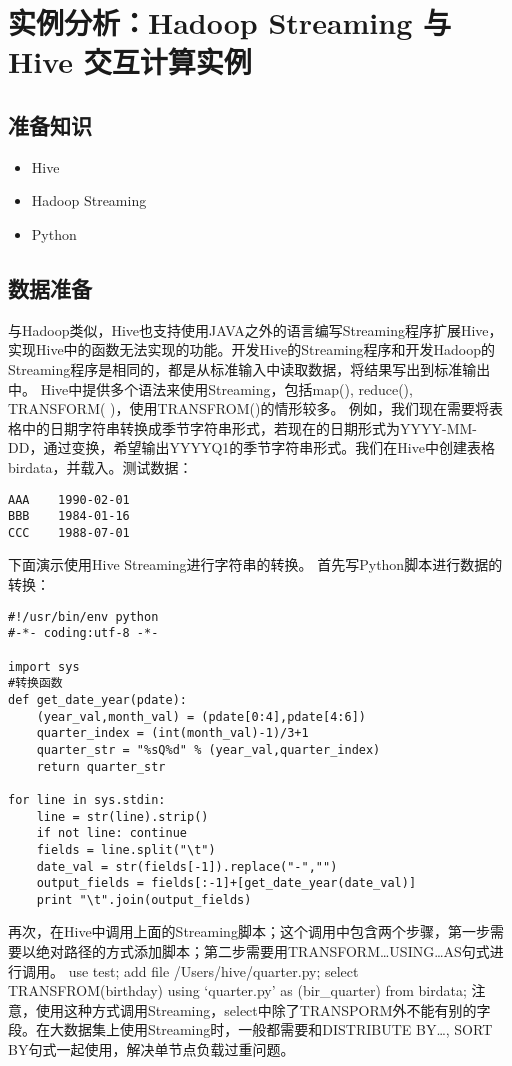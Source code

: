 \section{实例分析：Hadoop Streaming 与 Hive
交互计算实例}\label{ux5b9eux4f8bux5206ux6790hadoop-streaming-ux4e0e-hive-ux4ea4ux4e92ux8ba1ux7b97ux5b9eux4f8b}

\subsection{准备知识}\label{ux51c6ux5907ux77e5ux8bc6}

\begin{itemize}
\itemsep1pt\parskip0pt
\item
  Hive
\item
  Hadoop Streaming
\item
  Python
\end{itemize}

\subsection{数据准备}\label{ux6570ux636eux51c6ux5907}

与Hadoop类似，Hive也支持使用JAVA之外的语言编写Streaming程序扩展Hive，实现Hive中的函数无法实现的功能。开发Hive的Streaming程序和开发Hadoop的Streaming程序是相同的，都是从标准输入中读取数据，将结果写出到标准输出中。
Hive中提供多个语法来使用Streaming，包括map(), reduce(), TRANSFORM(
)，使用TRANSFROM()的情形较多。
例如，我们现在需要将表格中的日期字符串转换成季节字符串形式，若现在的日期形式为YYYY-MM-DD，通过变换，希望输出YYYYQ1的季节字符串形式。我们在Hive中创建表格birdata，并载入。测试数据：

\begin{lstlisting}
AAA    1990-02-01
BBB    1984-01-16
CCC    1988-07-01
\end{lstlisting}

下面演示使用Hive Streaming进行字符串的转换。
首先写Python脚本进行数据的转换：

\begin{lstlisting}
#!/usr/bin/env python
#-*- coding:utf-8 -*-

import sys
#转换函数
def get_date_year(pdate):
    (year_val,month_val) = (pdate[0:4],pdate[4:6])
    quarter_index = (int(month_val)-1)/3+1
    quarter_str = "%sQ%d" % (year_val,quarter_index)
    return quarter_str

for line in sys.stdin:
    line = str(line).strip()
    if not line: continue
    fields = line.split("\t")
    date_val = str(fields[-1]).replace("-","")
    output_fields = fields[:-1]+[get_date_year(date_val)]
    print "\t".join(output_fields)
\end{lstlisting}

再次，在Hive中调用上面的Streaming脚本；这个调用中包含两个步骤，第一步需要以绝对路径的方式添加脚本；第二步需要用TRANSFORM\ldots{}USING\ldots{}AS句式进行调用。
use test; add file /Users/hive/quarter.py; select TRANSFROM(birthday)
using `quarter.py' as (bir\_quarter) from birdata;
注意，使用这种方式调用Streaming，select中除了TRANSPORM外不能有别的字段。在大数据集上使用Streaming时，一般都需要和DISTRIBUTE
BY\ldots{}, SORT BY句式一起使用，解决单节点负载过重问题。
